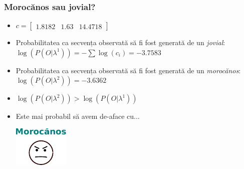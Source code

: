 \begin{frame}
  \frametitle{Morocănos sau jovial?}
  \begin{itemize}
    \item $c = \begin{bmatrix} \scriptstyle 1.8182 & \scriptstyle 1.63 &  \scriptstyle 14.4718\end{bmatrix}$
    \item Probabilitatea ca secvența observată să fi fost generată de un \emph{jovial}:\\
      $\log(P(O\vert \lambda^{1}))=-\displaystyle\sum\log(c_i) = -3.7583$\\\vspace*{1em}\pause%
    \item Probabilitatea ca secvența observată să fi fost generată de un \emph{morocănos}:\\
      $\log(P(O\vert \lambda^{2}))=-3.6362$\\\vspace*{1em}%
    \item $\log(P(O\vert \lambda^{2})) > \log(P(O\vert \lambda^{1}))$
    \item Este mai probabil să avem de-aface cu...\pause\\\vspace*{.5em}%
      \begin{center}\includegraphics{graphics/forward-backward/guys/surly-face.pdf}\end{center}
    \end{itemize}
\end{frame}


